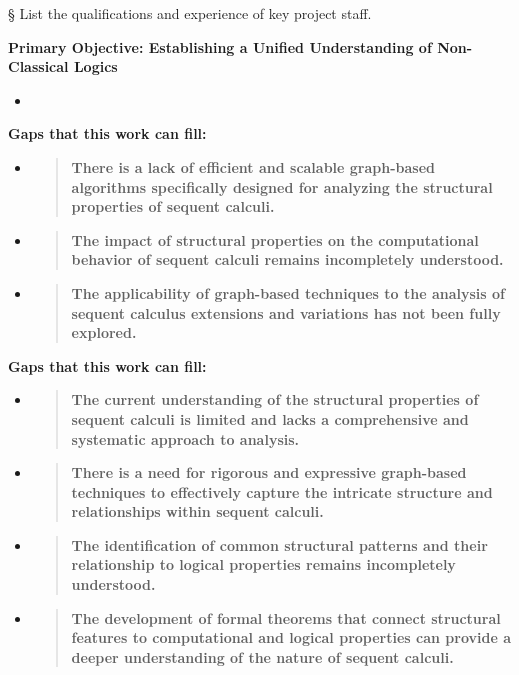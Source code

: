 § List the qualifications and experience of key project staff.

\textbf{Primary Objective: Establishing a Unified Understanding of
Non-Classical Logics}

\begin{itemize}
\tightlist
\item
\end{itemize}

\textbf{Gaps that this work can fill:}

\begin{itemize}
\item
  \begin{quote}
  \textbf{There is a lack of efficient and scalable graph-based
  algorithms specifically designed for analyzing the structural
  properties of sequent calculi.}
  \end{quote}
\item
  \begin{quote}
  \textbf{The impact of structural properties on the computational
  behavior of sequent calculi remains incompletely understood.}
  \end{quote}
\item
  \begin{quote}
  \textbf{The applicability of graph-based techniques to the analysis of
  sequent calculus extensions and variations has not been fully
  explored.}
  \end{quote}
\end{itemize}

\textbf{Gaps that this work can fill:}

\begin{itemize}
\item
  \begin{quote}
  \textbf{The current understanding of the structural properties of
  sequent calculi is limited and lacks a comprehensive and systematic
  approach to analysis.}
  \end{quote}
\item
  \begin{quote}
  \textbf{There is a need for rigorous and expressive graph-based
  techniques to effectively capture the intricate structure and
  relationships within sequent calculi.}
  \end{quote}
\item
  \begin{quote}
  \textbf{The identification of common structural patterns and their
  relationship to logical properties remains incompletely understood.}
  \end{quote}
\item
  \begin{quote}
  \textbf{The development of formal theorems that connect structural
  features to computational and logical properties can provide a deeper
  understanding of the nature of sequent calculi.}
  \end{quote}
\end{itemize}

